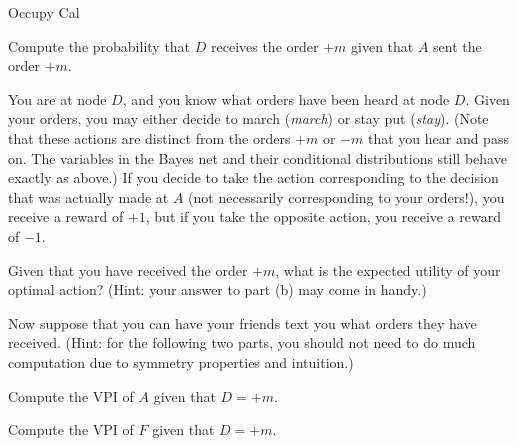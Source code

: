 \begin{problem}[14]{Occupy Cal}
\begin{question}[2] Compute the probability that $D$ receives the order $+m$ given that $A$ sent the order $+m$. \\
\end{question}

You are at node $D$, and you know what orders have been heard at node $D$. Given your orders, you may either decide to march (\emph{march}) or stay put (\emph{stay}). (Note that these actions are distinct from the orders $+m$ or $-m$ that you hear and pass on. The variables in the Bayes net and their conditional distributions still behave exactly as above.) If you decide to take the action corresponding to the decision that was actually made at $A$ (not necessarily corresponding to your orders!), you receive a reward of $+1$, but if you take the opposite action, you receive a reward of $-1$.
\newpage
\begin{question}[2] Given that you have received the order $+m$, what is the expected utility of your optimal action? (Hint: your answer to part (b) may come in handy.) \\
\end{question}


Now suppose that you can have your friends text you what orders they have received. (Hint: for the following two parts, you should not need to do much computation due to symmetry properties and intuition.)



\begin{question}[2] Compute the VPI of $A$ given that $D = +m$. \\
\end{question}
\begin{question}[2] Compute the VPI of $F$ given that $D = +m$. \\
\end{question}


\end{problem}

